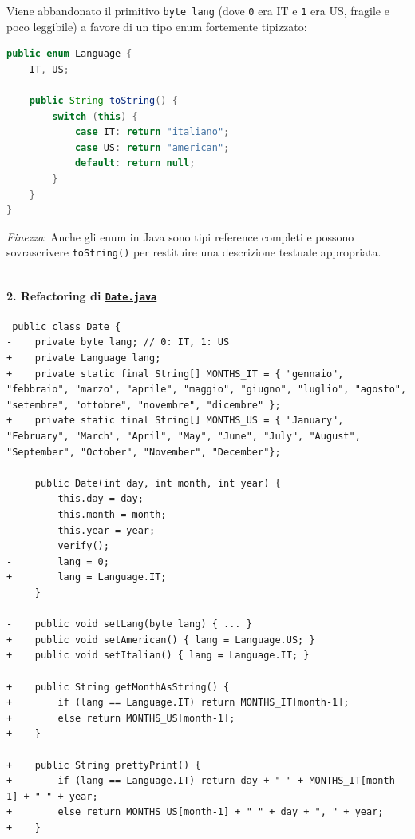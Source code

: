 \documentclass[11pt,a4paper]{article}
\newcommand{\passthrough}[1]{#1}
\begin{document}
Viene abbandonato il primitivo \passthrough{\lstinline!byte lang!} (dove
\passthrough{\lstinline!0!} era IT e \passthrough{\lstinline!1!} era US,
fragile e poco leggibile) a favore di un tipo enum fortemente tipizzato:

\begin{lstlisting}[language=Java]
public enum Language {
    IT, US;

    public String toString() {
        switch (this) {
            case IT: return "italiano";
            case US: return "american";
            default: return null;
        }
    }
}
\end{lstlisting}

\emph{Finezza}: Anche gli enum in Java sono tipi reference completi e
possono sovrascrivere \passthrough{\lstinline!toString()!} per
restituire una descrizione testuale appropriata.

\begin{center}\rule{0.5\linewidth}{0.5pt}\end{center}

\paragraph{\texorpdfstring{2. Refactoring di
\href{file:///home/wally/Documenti/GitHub/Programmazione-II/25-26/Teoria-e-Esercitazioni/Codice-20260902/Lezione08/SimpleDate/src/Date.java}{\texttt{Date.java}}}{2. Refactoring di Date.java}}\label{refactoring-di-date.java}

\begin{lstlisting}
 public class Date {
-    private byte lang; // 0: IT, 1: US
+    private Language lang;
+    private static final String[] MONTHS_IT = { "gennaio", "febbraio", "marzo", "aprile", "maggio", "giugno", "luglio", "agosto", "setembre", "ottobre", "novembre", "dicembre" };
+    private static final String[] MONTHS_US = { "January", "February", "March", "April", "May", "June", "July", "August", "September", "October", "November", "December"};

     public Date(int day, int month, int year) {
         this.day = day;
         this.month = month;
         this.year = year;
         verify();
-        lang = 0;
+        lang = Language.IT;
     }

-    public void setLang(byte lang) { ... }
+    public void setAmerican() { lang = Language.US; }
+    public void setItalian() { lang = Language.IT; }

+    public String getMonthAsString() {
+        if (lang == Language.IT) return MONTHS_IT[month-1];
+        else return MONTHS_US[month-1];
+    }

+    public String prettyPrint() {
+        if (lang == Language.IT) return day + " " + MONTHS_IT[month-1] + " " + year;
+        else return MONTHS_US[month-1] + " " + day + ", " + year;
+    }
\end{lstlisting}
\end{document}
